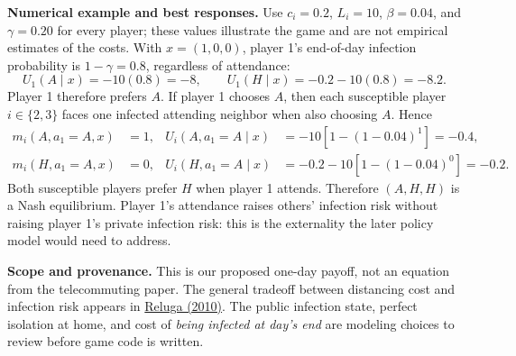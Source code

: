 \documentclass[10pt]{article}
\begin{document}
\textbf{Numerical example and best responses.}
Use $c_i=0.2$, $L_i=10$, $\beta=0.04$, and $\gamma=0.20$ for every
player; these values illustrate the game and are not empirical
estimates of the costs. With $x=(1,0,0)$, player 1's end-of-day
infection probability is $1-\gamma=0.8$, regardless of attendance:
\[
U_1(A\mid x)=-10(0.8)=-8,\qquad
U_1(H\mid x)=-0.2-10(0.8)=-8.2.
\]
Player 1 therefore prefers $A$. If player 1 chooses $A$, then each
susceptible player $i\in\{2,3\}$ faces one infected attending neighbor
when also choosing $A$. Hence
\[
\begin{aligned}
m_i(A,a_1=A,x)&=1,&
U_i(A,a_1=A\mid x)&=-10[1-(1-0.04)^1]=-0.4,\\
m_i(H,a_1=A,x)&=0,&
U_i(H,a_1=A\mid x)&=-0.2-10[1-(1-0.04)^0]=-0.2.
\end{aligned}
\]
Both susceptible players prefer $H$ when player 1 attends. Therefore
$(A,H,H)$ is a Nash equilibrium. Player 1's attendance raises others'
infection risk without raising player 1's private infection risk: this
is the externality the later policy model would need to address.

\textbf{Scope and provenance.}
This is our proposed one-day payoff, not an equation from the
telecommuting paper. The general tradeoff between distancing cost
and infection risk appears in
\href{https://doi.org/10.1371/journal.pcbi.1000793}{Reluga (2010)}.
The public infection state, perfect isolation at home, and cost of
\emph{being infected at day's end} are modeling choices to review
before game code is written.
\end{document}
